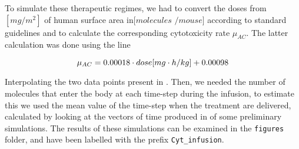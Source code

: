 To simulate these therapeutic regimes, we had to convert the doses from $[mg / m^2]$ of human surface area in$[molecules$ $/mouse]$ according to standard guidelines \cite{dose-conversion} and to calculate the corresponding cytotoxicity rate $\mu_{AC}$. The latter calculation was done using the line 

$$ \mu_{AC} = 0.00018 \cdot \small{dose} [mg \cdot h/kg]+ 0.00098 $$

Interpolating the two data points present in \cite{main-paper}. 
Then, we needed the number of molecules that enter the body at each time-step during the infusion, to estimate this we used the mean value of the time-step when the treatment are delivered, calculated by looking at the vectors of time produced in of some preliminary simulations. The results of these simulations can be examined in the \texttt{figures} folder, and have been labelled with the prefix \texttt{Cyt\_infusion}. 
